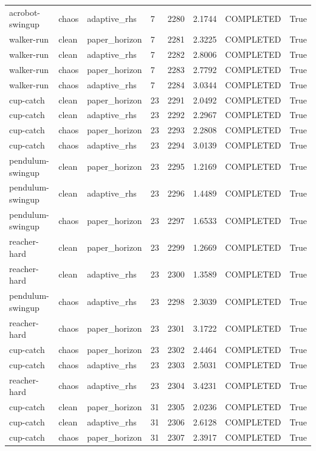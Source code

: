 \begin{tabular}{llllllll}
acrobot-swingup & chaos & adaptive\_rhs & 7 & 2280 & 2.1744 & COMPLETED & True \\
walker-run & clean & paper\_horizon & 7 & 2281 & 2.3225 & COMPLETED & True \\
walker-run & clean & adaptive\_rhs & 7 & 2282 & 2.8006 & COMPLETED & True \\
walker-run & chaos & paper\_horizon & 7 & 2283 & 2.7792 & COMPLETED & True \\
walker-run & chaos & adaptive\_rhs & 7 & 2284 & 3.0344 & COMPLETED & True \\
cup-catch & clean & paper\_horizon & 23 & 2291 & 2.0492 & COMPLETED & True \\
cup-catch & clean & adaptive\_rhs & 23 & 2292 & 2.2967 & COMPLETED & True \\
cup-catch & chaos & paper\_horizon & 23 & 2293 & 2.2808 & COMPLETED & True \\
cup-catch & chaos & adaptive\_rhs & 23 & 2294 & 3.0139 & COMPLETED & True \\
pendulum-swingup & clean & paper\_horizon & 23 & 2295 & 1.2169 & COMPLETED & True \\
pendulum-swingup & clean & adaptive\_rhs & 23 & 2296 & 1.4489 & COMPLETED & True \\
pendulum-swingup & chaos & paper\_horizon & 23 & 2297 & 1.6533 & COMPLETED & True \\
reacher-hard & clean & paper\_horizon & 23 & 2299 & 1.2669 & COMPLETED & True \\
reacher-hard & clean & adaptive\_rhs & 23 & 2300 & 1.3589 & COMPLETED & True \\
pendulum-swingup & chaos & adaptive\_rhs & 23 & 2298 & 2.3039 & COMPLETED & True \\
reacher-hard & chaos & paper\_horizon & 23 & 2301 & 3.1722 & COMPLETED & True \\
cup-catch & chaos & paper\_horizon & 23 & 2302 & 2.4464 & COMPLETED & True \\
cup-catch & chaos & adaptive\_rhs & 23 & 2303 & 2.5031 & COMPLETED & True \\
reacher-hard & chaos & adaptive\_rhs & 23 & 2304 & 3.4231 & COMPLETED & True \\
cup-catch & clean & paper\_horizon & 31 & 2305 & 2.0236 & COMPLETED & True \\
cup-catch & clean & adaptive\_rhs & 31 & 2306 & 2.6128 & COMPLETED & True \\
cup-catch & chaos & paper\_horizon & 31 & 2307 & 2.3917 & COMPLETED & True \\

\end{tabular}
